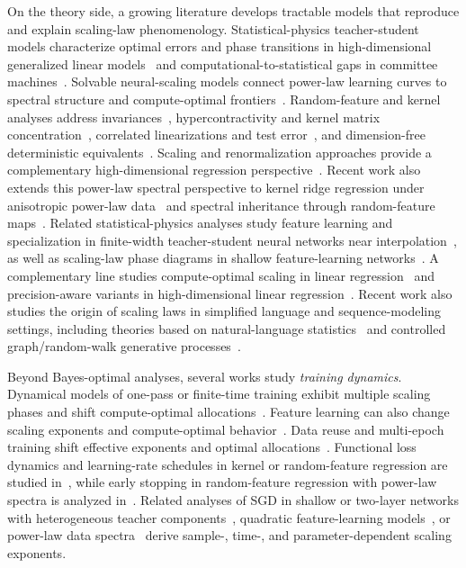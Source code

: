 \documentclass[11pt]{article}
\theoremstyle{plain}
\theoremstyle{definition}
\theoremstyle{remark}
\newcommand{\JSCheck}[1]{#1}
\begin{document}
\JSCheck{On the theory side, a growing literature develops tractable models that reproduce and explain scaling-law phenomenology. 
Statistical-physics teacher-student models characterize optimal errors and phase transitions in high-dimensional generalized linear models~\citep{barbier2019optimal} and computational-to-statistical gaps in committee machines~\citep{aubin2019committee}. 
Solvable neural-scaling models connect power-law learning curves to spectral structure and compute-optimal frontiers~\citep{Bahri2021ExplainingScaling,Maloney2022SolvableScaling}. 
Random-feature and kernel analyses address invariances~\citep{mei2021invariances}, hypercontractivity and kernel matrix concentration~\citep{mei2022generalization}, correlated linearizations and test error~\citep{LatourelleVigeant2023DysonRF}, and dimension-free deterministic equivalents~\citep{Defilippis2024DimensionFreeDE}. 
Scaling and renormalization approaches provide a complementary high-dimensional regression perspective~\citep{Atanasov2024ScalingRenorm}. 
Recent work also extends this power-law spectral perspective to kernel ridge regression under anisotropic power-law data~\citep{WortsmanLoureiro2025} and spectral inheritance through random-feature maps~\citep{PaquetteXiaoZhu2026}. 
Related statistical-physics analyses study feature learning and specialization in finite-width teacher-student neural networks near interpolation~\citep{barbier2025statistical}, as well as scaling-law phase diagrams in shallow feature-learning networks~\citep{defilippis2026scaling}. 
A complementary line studies compute-optimal scaling in linear regression~\citep{Lin2024LinRegScaling} and precision-aware variants in high-dimensional linear regression~\citep{zhang2026precision}. 
Recent work also studies the origin of scaling laws in simplified language and sequence-modeling settings, including theories based on natural-language statistics~\citep{cagnetta2026deriving} and controlled graph/random-walk generative processes~\citep{barkeshli2026origin}.}


\JSCheck{Beyond Bayes-optimal analyses, several works study \emph{training dynamics}. 
Dynamical models of one-pass or finite-time training exhibit multiple scaling phases and shift compute-optimal allocations~\citep{Bordelon2024DynamicalScaling,Paquette2024Phases}. 
Feature learning can also change scaling exponents and compute-optimal behavior~\citep{bordelon2025featurelearning}. 
Data reuse and multi-epoch training shift effective exponents and optimal allocations~\citep{Lin2025DataReuse,yan2025largerdatasetsrepeatedmore}. 
Functional loss dynamics and learning-rate schedules in kernel or random-feature regression are studied in~\citep{li2025functional,bordelon2026optimal}, while early stopping in random-feature regression with power-law spectra is analyzed in~\citep{kramp2026dynamics}. 
Related analyses of SGD in shallow or two-layer networks with heterogeneous teacher components~\citep{RenNichaniWuLee2025}, quadratic feature-learning models~\citep{benarous2025quadratic}, or power-law data spectra~\citep{WorschechRosenow2024} derive sample-, time-, and parameter-dependent scaling exponents.}
\end{document}
